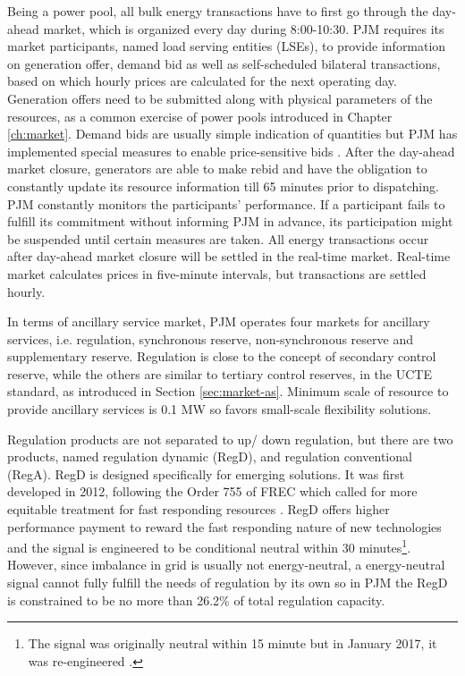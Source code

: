 Being a power pool, all bulk energy transactions have to first go through the day-ahead market, which is organized every day during 8:00-10:30. PJM requires its market participants, named load serving entities (LSEs), to provide information on generation offer, demand bid as well as self-scheduled bilateral transactions, based on which hourly prices are calculated for the next operating day. Generation offers need to be submitted along with physical parameters of the resources, as a common exercise of power pools introduced in Chapter \ref{ch:market}. Demand bids are usually simple indication of quantities but PJM has implemented special measures to enable price-sensitive bids \cite{PJM2015,PJM2017b}. After the day-ahead market closure, generators are able to make rebid and have the obligation to constantly update its resource information till 65 minutes prior to dispatching. PJM constantly monitors the participants' performance. If a participant fails to fulfill its commitment without informing PJM in advance, its participation might be suspended until certain measures are taken. All energy transactions occur after day-ahead market closure will be settled in the real-time market. Real-time market calculates prices in five-minute intervals, but transactions are settled hourly.

In terms of ancillary service market, PJM operates four markets for ancillary services, i.e. regulation, synchronous reserve, non-synchronous reserve and supplementary reserve. Regulation is close to the concept of secondary control reserve, while the others are similar to tertiary control reserves, in the UCTE standard, as introduced in Section \ref{sec:market-as}. Minimum scale of resource to provide ancillary services is 0.1 MW so favors small-scale flexibility solutions. 

Regulation products are not separated to up/ down regulation, but there are two products, named regulation dynamic (RegD), and regulation conventional (RegA). RegD is designed specifically for emerging solutions. It was first developed in 2012, following the Order 755 of FREC which called for more equitable treatment for fast responding resources
\cite{FERC755}. RegD offers higher performance payment to reward the fast responding nature of new technologies and the signal is engineered to be conditional neutral within 30 minutes\footnote{The signal was originally neutral within 15 minute but in January 2017, it was re-engineered \cite{PJM2017b}.}. However, since imbalance in grid is usually not energy-neutral, a energy-neutral signal cannot fully fulfill the needs of regulation by its own so in PJM the RegD is constrained to be no more than 26.2\% of total regulation capacity. 

